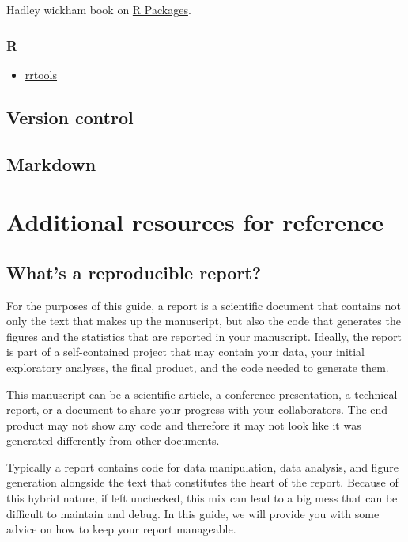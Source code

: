 \documentclass[
]{book}
\providecommand{\tightlist}{%
  \setlength{\itemsep}{0pt}\setlength{\parskip}{0pt}}
\begin{document}
Hadley wickham book on \href{http://r-pkgs.had.co.nz/}{R Packages}.

\hypertarget{r}{%
\subsection{R}\label{r}}

\begin{itemize}
\tightlist
\item
  \href{https://github.com/benmarwick/rrtools}{rrtools}
\end{itemize}

\hypertarget{version-control}{%
\section{Version control}\label{version-control}}

\hypertarget{markdown}{%
\section{Markdown}\label{markdown}}

\hypertarget{additional-resources-for-reference}{%
\chapter{Additional resources for reference}\label{additional-resources-for-reference}}

\hypertarget{whats-a-reproducible-report}{%
\section{What's a reproducible report?}\label{whats-a-reproducible-report}}

For the purposes of this guide, a report is a scientific document that contains not only the text that makes up the manuscript, but also the code that generates the figures and the statistics that are reported in your manuscript. Ideally, the report is part of a self-contained project that may contain your data, your initial exploratory analyses, the final product, and the code needed to generate them.

This manuscript can be a scientific article, a conference presentation, a technical report, or a document to share your progress with your collaborators. The end product may not show any code and therefore it may not look like it was generated differently from other documents.

Typically a report contains code for data manipulation, data analysis, and figure generation alongside the text that constitutes the heart of the report. Because of this hybrid nature, if left unchecked, this mix can lead to a big mess that can be difficult to maintain and debug. In this guide, we will provide you with some advice on how to keep your report manageable.
\end{document}
